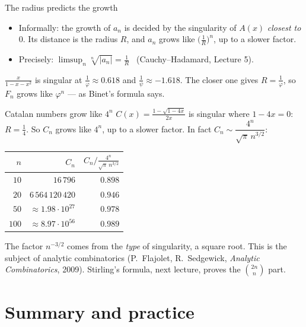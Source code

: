 \documentclass[10pt]{wosm-slides}
\begin{document}
\begin{frame}{The radius predicts the growth}
  \begin{itemize}
    \item Informally: the growth of $a_n$ is decided by the singularity of $A(x)$ \emph{closest
      to $0$}. Its distance is the radius $R$, and $a_n$ grows like $\bigl(\frac1R\bigr)^n$,
      up to a slower factor.
    \item Precisely: $\limsup_n \sqrt[n]{|a_n|} = \frac1R$ \ (Cauchy--Hadamard, Lecture 5).
  \end{itemize}
  \pause
  \begin{example}[Fibonacci]
    $\frac{x}{1 - x - x^2}$ is singular at $\frac1\varphi \approx 0.618$ and
    $\frac1\psi \approx -1.618$. The closer one gives $R = \frac1\varphi$, so $F_n$ grows like
    $\varphi^n$ --- as Binet's formula says.
  \end{example}
\end{frame}

\begin{frame}{Catalan numbers grow like $4^n$}
  $C(x) = \frac{1 - \sqrt{1 - 4x}}{2x}$ is singular where $1 - 4x = 0$: \ $R = \frac14$.
  So $C_n$ grows like $4^n$, up to a slower factor. In fact
  $C_n \sim \dfrac{4^n}{\sqrt\pi\, n^{3/2}}$:
  \begin{center}
  \small
  \begin{tabular}{rrr}
    \toprule
    $n$ & $C_n$ & $C_n \big/ \frac{4^n}{\sqrt\pi\, n^{3/2}}$ \\
    \midrule
    $10$  & $16\,796$             & $0.898$ \\
    $20$  & $6\,564\,120\,420$    & $0.946$ \\
    $50$  & $\approx 1.98 \cdot 10^{27}$ & $0.978$ \\
    $100$ & $\approx 8.97 \cdot 10^{56}$ & $0.989$ \\
    \bottomrule
  \end{tabular}
  \end{center}
  {\small The factor $n^{-3/2}$ comes from the \emph{type} of singularity, a square root.
  This is the subject of analytic combinatorics (P.~Flajolet, R.~Sedgewick,
  \emph{Analytic Combinatorics}, 2009). Stirling's formula, next lecture, proves the
  $\binom{2n}{n}$ part.\par}
\end{frame}

\section{Summary and practice}
\end{document}

